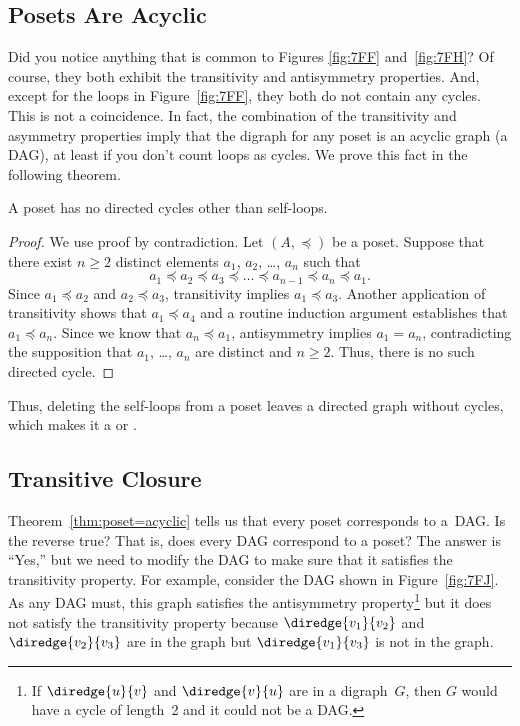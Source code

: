 \subsection{Posets Are Acyclic}

Did you notice anything that is common to Figures \ref{fig:7FF}
and~\ref{fig:7FH}?  Of course, they both exhibit the transitivity and
antisymmetry properties.  And, except for the loops in
Figure~\ref{fig:7FF}, they both do not contain any cycles.  This is
not a coincidence.  In fact, the combination of the transitivity and
asymmetry properties imply that the digraph for any poset is an
acyclic graph (\ie a DAG), at least if you don't count loops as
cycles.  We prove this fact in the following theorem.

\begin{theorem}\label{thm:poset=acyclic}
A poset has no directed cycles other than self-loops.
\end{theorem}

\begin{proof}

We use proof by contradiction.  Let $(A, \preceq)$ be a poset.
Suppose that there exist $n \ge 2$ distinct elements $a_1$, $a_2$,
\dots, $a_n$ such that
\begin{equation*}
    a_1 \preceq a_2 \preceq a_3 \preceq \dots \preceq a_{n - 1}
    \preceq a_n \preceq a_1.
\end{equation*}
Since $a_1 \preceq a_2$ and $a_2 \preceq a_3$, transitivity implies
$a_1 \preceq a_3$.  Another application of transitivity shows that
$a_1 \preceq a_4$ and a routine induction argument establishes that
$a_1 \preceq a_n$.  Since we know that $a_n \preceq a_1$, antisymmetry
implies $a_1 = a_n$, contradicting the supposition that $a_1$, \dots,
$a_n$ are distinct and $n \ge 2$.  Thus, there is no such directed
cycle.
\end{proof}

Thus, deleting the self-loops from a poset leaves a directed graph
without cycles, which makes it a  or
.

\subsection{Transitive Closure}

Theorem~\ref{thm:poset=acyclic} tells us that every poset corresponds
to a~DAG\@.  Is the reverse true?  That is, does every DAG correspond
to a poset?  The answer is ``Yes,'' but we need to modify the DAG to
make sure that it satisfies the transitivity property.  For example,
consider the DAG shown in Figure~\ref{fig:7FJ}.  As any DAG must, this
graph satisfies the antisymmetry property\footnote{If
  $\diredge{u}{v}$ and $\diredge{v}{u}$ are in a digraph~$G$, then $G$
would have a cycle of length~2 and it could not be a DAG.} but it does
not satisfy the transitivity property because $\diredge{v_1}{v_2}$ and
$\diredge{v_2}{v_3}$ are in the graph but $\diredge{v_1}{v_3}$ is not
in the graph.

